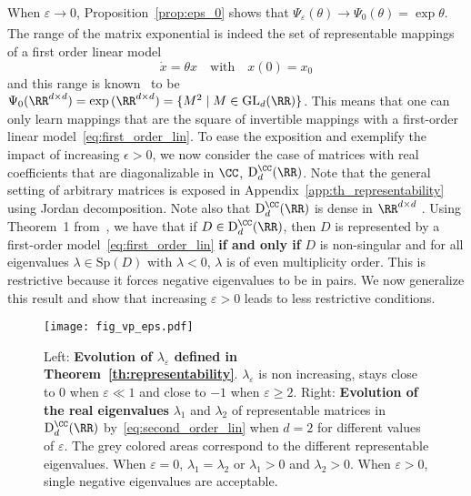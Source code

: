 \documentclass{article}
\begin{document}
When $\varepsilon \xrightarrow[]{} 0$, Proposition~\ref{prop:eps_0} shows that
 $\Psi_{\varepsilon}(\theta) \xrightarrow{} \Psi_0(\theta) =  \exp \theta$. 
The range of the matrix exponential is indeed the set of representable mappings of a first order linear model 
\begin{equation}\label{eq:first_order_lin}
 \dot{x} = \theta x
 \quad\text{with}\quad
 x(0) = x_0
\end{equation}
and this range is known~\citep{andrica2010image} to be
$
\Psi_0(\RR^{d \times d}) = \exp{(\RR^{d \times d})} = \{M^2 \mid M \in \mathrm{GL}_d(\RR)\}
$.
This means that one can only learn mappings that are the square of invertible mappings with a first-order linear model~\eqref{eq:first_order_lin}. 
To ease the exposition and exemplify the impact of increasing $\epsilon>0$, we now consider the case of matrices with real coefficients that are diagonalizable in $\CC$, $\mathrm{D}_{d}^{\CC}(\RR)$. 
Note that the general setting of arbitrary matrices is exposed in Appendix~\ref{app:th_representability} using Jordan decomposition. Note also that $\mathrm{D}_{d}^{\CC}(\RR)$ is dense in $\RR^{d \times d}$ \citep{10.2307/2160975}. 
Using Theorem~1 from~\citet{culver1966existence}, we have that if $D \in \mathrm{D}_{d}^{\CC}(\RR)$, then $D$ is represented by a first-order model~\eqref{eq:first_order_lin} \textbf{if and only if} $D$ is non-singular and for all eigenvalues $\lambda \in \mathrm{Sp}(D)$ with $\lambda <0$, $\lambda$ is of even multiplicity order. This is restrictive because it forces negative eigenvalues to be in pairs. We now generalize this result and show that increasing $\varepsilon > 0$ leads to less restrictive conditions.
\begin{figure}[H]
\centering
 \texttt{[image: fig\_vp\_eps.pdf]}
\caption{Left: \textbf{Evolution of $\lambda_\varepsilon$ defined in Theorem~\ref{th:representability}}. $\lambda_\varepsilon$ is non increasing, stays close to $0$ when $\varepsilon \ll 1$ and close to $-1$ when $\varepsilon \geq 2$. Right: \textbf{Evolution of the real eigenvalues} $\lambda_1$ and $\lambda_2$ of representable matrices in $\mathrm{D}_{d}^{\CC}(\RR)$ by~\eqref{eq:second_order_lin} when $d = 2$ for different values of $\varepsilon$. The grey colored areas correspond to the different representable eigenvalues. When $\varepsilon=0$, $\lambda_1 = \lambda_2$ or $\lambda_1 > 0$ and $\lambda_2 > 0$. When $\varepsilon >0$, single negative eigenvalues are acceptable.}\label{fig:linear}
\vspace{-1em}
\end{figure}
\end{document}
